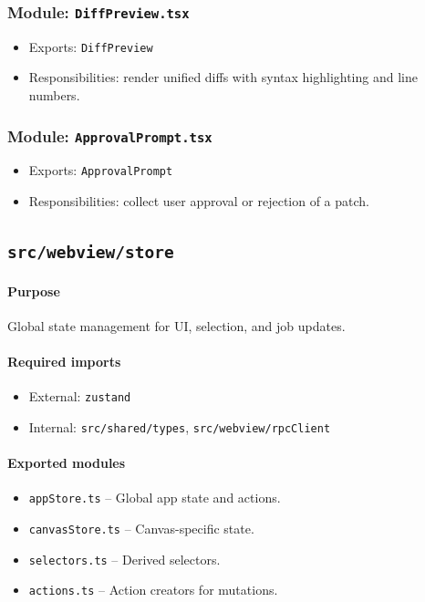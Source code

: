 \documentclass[11pt]{article}
\begin{document}
\subsubsection*{Module: \texttt{DiffPreview.tsx}}
\begin{itemize}[noitemsep]
  \item Exports: \texttt{DiffPreview}
  \item Responsibilities: render unified diffs with syntax highlighting and line numbers.
\end{itemize}

\subsubsection*{Module: \texttt{ApprovalPrompt.tsx}}
\begin{itemize}[noitemsep]
  \item Exports: \texttt{ApprovalPrompt}
  \item Responsibilities: collect user approval or rejection of a patch.
\end{itemize}

\subsection{\texttt{src/webview/store}}
\paragraph{Purpose} Global state management for UI, selection, and job updates.

\paragraph{Required imports}
\begin{itemize}[noitemsep]
  \item External: \texttt{zustand}
  \item Internal: \texttt{src/shared/types}, \texttt{src/webview/rpcClient}
\end{itemize}

\paragraph{Exported modules}
\begin{itemize}[noitemsep]
  \item \texttt{appStore.ts} -- Global app state and actions.
  \item \texttt{canvasStore.ts} -- Canvas-specific state.
  \item \texttt{selectors.ts} -- Derived selectors.
  \item \texttt{actions.ts} -- Action creators for mutations.
\end{itemize}
\end{document}
